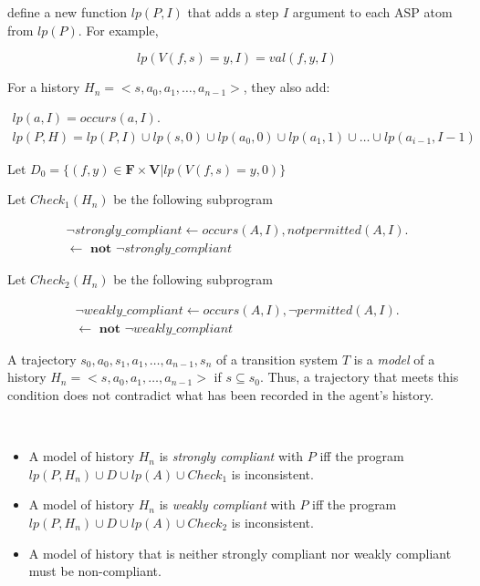 \citet{gelfond_authorization_2008} define a new function $lp(P, I)$ that adds a step $I$ argument to each ASP atom from $lp(P)$.
For example,

\[
lp(V(f,s)=y, I) = val(f,y,I)
\]

For a history $H_n=<s, a_0, a_1, \dots, a_{n-1}>$, they also add:

\begin{gather*}
    lp(a, I)=occurs(a, I). \\
    lp(P, H) = lp(P, I) \cup lp(s, 0) \cup lp(a_0, 0) \cup lp(a_1, 1) \cup \dots \cup lp(a_{i-1}, I-1)
\end{gather*}

Let $D_0 = \{ (f,y) \in \boldsymbol{F} \times \boldsymbol{V} | lp(V(f,s)=y, 0)\}$

Let $Check_1(H_n)$ be the following subprogram

\begin{gather*}
    \neg strongly\_compliant \leftarrow occurs(A, I), not permitted(A, I). \\
    \leftarrow \textbf{ not } \neg strongly\_compliant
\end{gather*}

Let $Check_2(H_n)$ be the following subprogram

\begin{gather*}
    \neg weakly\_compliant \leftarrow occurs(A, I), \neg permitted(A, I). \\
    \leftarrow \textbf{ not } \neg weakly\_compliant
\end{gather*}

\begin{definition}
    A trajectory $s_0, a_0, s_1, a_1, \dots, a_{n-1}, s_n$ of a transition system $T$ is a \textit{model} of a history $H_n = <s, a_0, a_1, \dots, a_{n-1}>$ if $s \subseteq s_0$.
    Thus, a trajectory that meets this condition does not contradict what has been recorded in the agent's history.
\end{definition}

\begin{definition}
    ~

    \begin{itemize}
        \item A model of history $H_n$ is \textit{strongly compliant} with $P$ iff the program $lp(P, H_n) \cup D \cup lp(A) \cup Check_1$ is inconsistent.
        \item A model of history $H_n$ is \textit{weakly compliant} with $P$ iff the program $lp(P, H_n) \cup D \cup lp(A) \cup Check_2$ is inconsistent.
        \item A model of history that is neither strongly compliant nor weakly compliant must be non-compliant.
    \end{itemize}
\end{definition}

